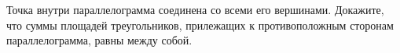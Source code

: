 \begin{ex}
	\begin{condition}
		Точка внутри параллелограмма соединена со всеми его вершинами. Докажите, что суммы площадей треугольников,	прилежащих к противоположным сторонам параллелограмма, равны между собой.
	\end{condition}
\end{ex}